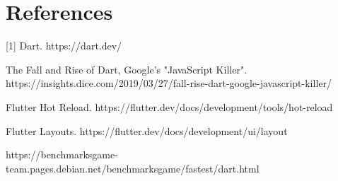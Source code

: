 \section*{References}
[1] Dart.    https://dart.dev/

\noindent [2] The Fall and Rise of Dart, Google's "JavaScript Killer".       https://insights.dice.com/2019/03/27/fall-rise-dart-google-javascript-killer/

\noindent [3] Flutter Hot Reload.      https://flutter.dev/docs/development/tools/hot-reload

\noindent [4] Flutter Layouts.      https://flutter.dev/docs/development/ui/layout

\noindent [5] https://benchmarksgame-team.pages.debian.net/benchmarksgame/fastest/dart.html



